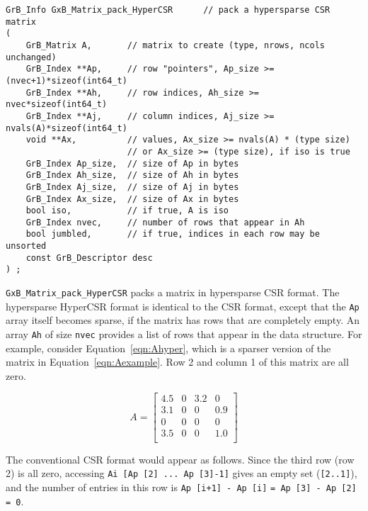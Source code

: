 \documentclass[12pt]{article}
\begin{document}
{\begin{mdframed}[userdefinedwidth=6in]
{\footnotesize
\begin{verbatim}
GrB_Info GxB_Matrix_pack_HyperCSR      // pack a hypersparse CSR matrix
(
    GrB_Matrix A,       // matrix to create (type, nrows, ncols unchanged)
    GrB_Index **Ap,     // row "pointers", Ap_size >= (nvec+1)*sizeof(int64_t)
    GrB_Index **Ah,     // row indices, Ah_size >= nvec*sizeof(int64_t)
    GrB_Index **Aj,     // column indices, Aj_size >= nvals(A)*sizeof(int64_t)
    void **Ax,          // values, Ax_size >= nvals(A) * (type size)
                        // or Ax_size >= (type size), if iso is true
    GrB_Index Ap_size,  // size of Ap in bytes
    GrB_Index Ah_size,  // size of Ah in bytes
    GrB_Index Aj_size,  // size of Aj in bytes
    GrB_Index Ax_size,  // size of Ax in bytes
    bool iso,           // if true, A is iso
    GrB_Index nvec,     // number of rows that appear in Ah
    bool jumbled,       // if true, indices in each row may be unsorted
    const GrB_Descriptor desc
) ;
\end{verbatim}
} \end{mdframed}


\verb'GxB_Matrix_pack_HyperCSR' packs a matrix in hypersparse CSR format.
The hypersparse HyperCSR format is identical to the CSR format, except that the
\verb'Ap' array itself becomes sparse, if the matrix has rows that are
completely empty.  An array \verb'Ah' of size \verb'nvec' provides a list of
rows that appear in the data structure.  For example, consider
Equation~\ref{eqn:Ahyper}, which is a sparser version of the matrix in
Equation~\ref{eqn:Aexample}.  Row 2 and column 1 of this matrix are all zero.

    \begin{equation}
    \label{eqn:Ahyper}
    A = \left[
    \begin{array}{cccc}
    4.5 &   0 & 3.2 &   0 \\
    3.1 &   0 &  0  & 0.9 \\
     0  &   0 &  0  &   0 \\
    3.5 &   0 &  0  & 1.0 \\
    \end{array}
    \right]
    \end{equation}

The conventional CSR format would appear as follows.  Since the third row (row
2) is all zero, accessing \verb'Ai [Ap [2] ... Ap [3]-1]' gives an empty set
(\verb'[2..1]'), and the number of entries in this row is
\verb'Ap [i+1] - Ap [i]' \verb'= Ap [3] - Ap [2] = 0'.

}
\end{document}
